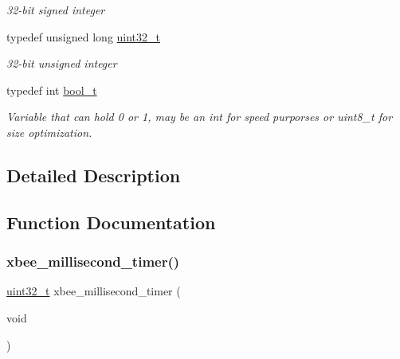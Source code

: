 \begin{DoxyCompactItemize}
\begin{DoxyCompactList}\small\item\em 32-\/bit signed integer \end{DoxyCompactList}\item 
\mbox{\label{group__hal__dos_ga09a1e304d66d35dd47daffee9731edaa}} 
typedef unsigned long \hyperlink{group__hal__dos_ga09a1e304d66d35dd47daffee9731edaa}{uint32\+\_\+t}
\begin{DoxyCompactList}\small\item\em 32-\/bit unsigned integer \end{DoxyCompactList}\item 
\mbox{\label{group__hal__dos_ga04dd5074964518403bf944f2b240a5f8}} 
typedef int \hyperlink{group__hal__dos_ga04dd5074964518403bf944f2b240a5f8}{bool\+\_\+t}
\begin{DoxyCompactList}\small\item\em Variable that can hold 0 or 1, may be an {\ttfamily int} for speed purporses or {\ttfamily uint8\+\_\+t} for size optimization. \end{DoxyCompactList}\end{DoxyCompactItemize}


\subsection{Detailed Description}


\subsection{Function Documentation}
\mbox{\label{group__hal__dos_ga63bb246b86f72e88fa8ddc7a429c0e67}} 
\subsubsection{\texorpdfstring{xbee\+\_\+millisecond\+\_\+timer()}{xbee\_millisecond\_timer()}}
{\footnotesize\ttfamily \hyperlink{group__hal__dos_ga09a1e304d66d35dd47daffee9731edaa}{uint32\+\_\+t} xbee\+\_\+millisecond\+\_\+timer (\begin{DoxyParamCaption}\item[{void}]{ }\end{DoxyParamCaption})}



